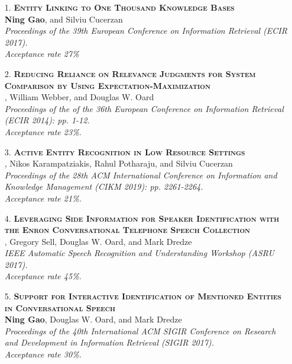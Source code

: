 \documentclass[a4paper, 11pt]{article}
\begin{document}
\begin{itemize}

\item[\color{bl3} 1.]{\scshape\color{bl3}\bf Entity Linking to One Thousand Knowledge Bases}\\
{\color{black} \textbf{Ning Gao}, and Silviu Cucerzan \\
\emph{Proceedings of the 39th European Conference on Information Retrieval (ECIR 2017).\\ Acceptance rate 27\%}}
\vspace{2mm}

\item[\color{bl3} 2.]{\scshape\color{bl3}\bf Reducing Reliance on Relevance Judgments for System Comparison by Using Expectation-Maximization}\\
, William Webber, and Douglas W. Oard\\
\emph{Proceedings of the of the 36th European Conference on Information Retrieval (ECIR 2014): pp. 1-12.\\ Acceptance rate 23\%.}
\vspace{2mm}

\item[\color{bl3} 3.]{\scshape\color{bl3}\bf Active Entity Recognition in Low Resource Settings}\\
, Nikos Karampatziakis, Rahul Potharaju, and Silviu Cucerzan\\
\emph{Proceedings of the 28th ACM International Conference on Information and Knowledge Management (CIKM 2019): pp. 2261-2264.\\ Acceptance rate 21\%.}
\vspace{2mm}

\item[\color{bl3} 4.]{\scshape\color{bl3}\bf Leveraging Side Information for Speaker Identification with the Enron Conversational Telephone Speech Collection}\\
, Gregory Sell, Douglas W. Oard, and Mark Dredze\\
\emph{IEEE Automatic Speech Recognition and Understanding Workshop  (ASRU 2017).\\ Acceptance rate 45\%.}
\vspace{2mm}


\item[\color{bl3} 5.]{\scshape\color{bl3}\bf Support for Interactive Identification of Mentioned Entities in Conversational Speech}\\
{\color{black} \textbf{Ning Gao}, Douglas W. Oard, and Mark Dredze \\
\emph{Proceedings of the 40th International ACM SIGIR Conference on Research and Development in Information Retrieval (SIGIR 2017).\\ Acceptance rate 30\%.}}
\vspace{2mm}


\end{itemize}
\end{document}
